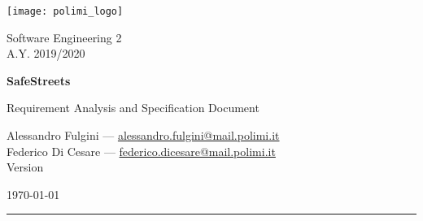 
\parbox[t]{\textwidth}{ %
      \parbox[c][3\baselineskip]{.5\linewidth}{ %
        \Large\texttt{[image: polimi\_logo]}
      }%
      \parbox[c][3\baselineskip]{.5\linewidth}{ %
        \Large\raggedleft
        \sffamily\selectfont
        Software Engineering 2\\
        A.Y. 2019/2020
      }
      \parbox[t]{0.88\textwidth}{ %
        \sffamily
				\vspace{4.25cm} %

        {\fontsize{50pt}{70pt}\bfseries\selectfont SafeStreets\\}

        \vspace{0.7cm}
        {\LARGE Requirement Analysis and Specification Document\\}
				\vspace{30pt} %
			}
		}

    \vfill %


  	\parbox[t]{0.93\textwidth}{ %
      \sffamily
  		\large %

      Alessandro Fulgini ---
      \href{mailto:alessandro.fulgini@mail.polimi.it}{alessandro.fulgini@mail.polimi.it}\\
      Federico Di Cesare ---
      \href{mailto:federico.dicesare@mail.polimi.it}{federico.dicesare@mail.polimi.it}\\

      {Version \Version}

  		\today

  		\rule{0.275\linewidth}{1pt}%
  	}